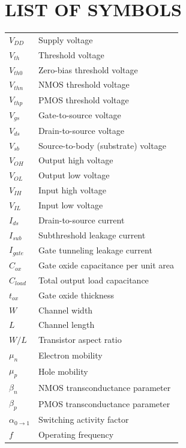 \documentclass[12pt,a4paper,oneside]{report}
\begin{document}
\clearpage

\chapter*{LIST OF SYMBOLS}

\noindent\begin{tabular}{p{3cm} p{10.5cm}}
$V_{DD}$ & Supply voltage \\[5pt]
$V_{th}$ & Threshold voltage \\[5pt]
$V_{th0}$ & Zero-bias threshold voltage \\[5pt]
$V_{thn}$ & NMOS threshold voltage \\[5pt]
$V_{thp}$ & PMOS threshold voltage \\[5pt]
$V_{gs}$ & Gate-to-source voltage \\[5pt]
$V_{ds}$ & Drain-to-source voltage \\[5pt]
$V_{sb}$ & Source-to-body (substrate) voltage \\[5pt]
$V_{OH}$ & Output high voltage \\[5pt]
$V_{OL}$ & Output low voltage \\[5pt]
$V_{IH}$ & Input high voltage \\[5pt]
$V_{IL}$ & Input low voltage \\[5pt]
$I_{ds}$ & Drain-to-source current \\[5pt]
$I_{sub}$ & Subthreshold leakage current \\[5pt]
$I_{gate}$ & Gate tunneling leakage current \\[5pt]
$C_{ox}$ & Gate oxide capacitance per unit area \\[5pt]
$C_{load}$ & Total output load capacitance \\[5pt]
$t_{ox}$ & Gate oxide thickness \\[5pt]
$W$ & Channel width \\[5pt]
$L$ & Channel length \\[5pt]
$W/L$ & Transistor aspect ratio \\[5pt]
$\mu_n$ & Electron mobility \\[5pt]
$\mu_p$ & Hole mobility \\[5pt]
$\beta_n$ & NMOS transconductance parameter \\[5pt]
$\beta_p$ & PMOS transconductance parameter \\[5pt]
$\alpha_{0\rightarrow 1}$ & Switching activity factor \\[5pt]
$f$ & Operating frequency \\[5pt]

\end{tabular}
\end{document}
